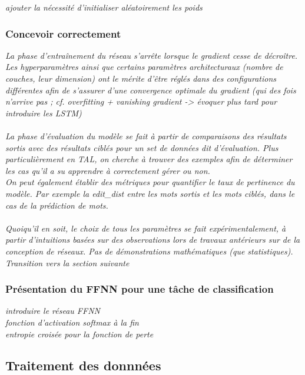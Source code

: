\documentclass[12pt, french, twoside]{report}
\begin{document}
\textit{ajouter la nécessité d'initialiser aléatoirement les poids}

\subsubsection{Concevoir correctement}

\textit{
    La phase d'entraînement du réseau s'arrête lorsque le gradient cesse de décroître.\\
    Les hyperparamètres ainsi que certains paramètres architecturaux (nombre de couches, leur dimension) ont le mérite d'être réglés dans des configurations différentes afin de s'assurer d'une convergence optimale du gradient (qui des fois n'arrive pas ; cf. overfitting + vanishing gradient -> évoquer plus tard pour introduire les LSTM)\\
    \\
    La phase d'évaluation du modèle se fait à partir de comparaisons des résultats sortis avec des résultats ciblés pour un set de données dit d'évaluation. Plus particulièrement en TAL, on cherche à trouver des exemples afin de déterminer les cas qu'il a su apprendre à correctement gérer ou non.\\
    On peut également établir des métriques pour quantifier le taux de pertinence du modèle.
    Par exemple la \gls{edit_dist} entre les mots sortis et les mots ciblés, dans le cas de la prédiction de mots.\\
    \\
    Quoiqu'il en soit, le choix de tous les paramètres se fait expérimentalement, à partir d'intuitions basées sur des observations lors de travaux antérieurs sur de la conception de réseaux. Pas de démonstrations mathématiques (que statistiques).\\
    Transition vers la section suivante
    }

\subsubsection{Présentation du FFNN pour une tâche de classification}
\textit{introduire le réseau FFNN\\
    fonction d'activation softmax à la fin\\
    entropie croisée pour la fonction de perte\\
    }
\subsection{Traitement des donnnées}
\end{document}
